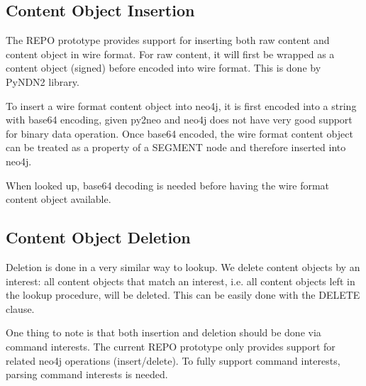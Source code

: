 \subsection{Content Object Insertion}

The REPO prototype provides support for inserting both raw content and content object in wire format. For raw content, it will first be wrapped as a content object (signed) before encoded into wire format. This is done by PyNDN2 library.

To insert a wire format content object into neo4j, it is first encoded into a string with base64 encoding, given py2neo and neo4j does not have very good support for binary data operation. Once base64 encoded, the wire format content object can be treated as a property of a SEGMENT node and therefore inserted into neo4j.

When looked up, base64 decoding is needed before having the wire format content object available.

\subsection{Content Object Deletion}

Deletion is done in a very similar way to lookup. We delete content objects by an interest: all content objects that match an interest, i.e. all content objects left in the lookup procedure, will be deleted. This can be easily done with the DELETE clause.

One thing to note is that both insertion and deletion should be done via command interests. The current REPO prototype only provides support for related neo4j operations (insert/delete). To fully support command interests, parsing command interests is needed. 